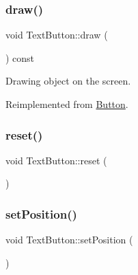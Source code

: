 \mbox{\label{class_text_button_a8af6b4a6e9084f157ffb015d29a02fcf}} 
\subsubsection{\texorpdfstring{draw()}{draw()}}
{\footnotesize\ttfamily void Text\+Button\+::draw (\begin{DoxyParamCaption}\item[{\mbox{\hyperlink{class_game_engine}{Game\+Engine}} $\ast$}]{ }\end{DoxyParamCaption}) const\hspace{0.3cm}{\ttfamily [virtual]}}



Drawing object on the screen. 



Reimplemented from \mbox{\hyperlink{class_button_a99e75218b31357786cff815f87f1a093}{Button}}.

\mbox{\label{class_text_button_aed840bcd62454c1233d4eadaa8b6e3b5}} 
\subsubsection{\texorpdfstring{reset()}{reset()}}
{\footnotesize\ttfamily void Text\+Button\+::reset (\begin{DoxyParamCaption}{ }\end{DoxyParamCaption})\hspace{0.3cm}{\ttfamily [inline]}}

\mbox{\label{class_text_button_a4550c33ce65f77b9e9e119526bfcc357}} 
\subsubsection{\texorpdfstring{setPosition()}{setPosition()}}
{\footnotesize\ttfamily void Text\+Button\+::set\+Position (\begin{DoxyParamCaption}\item[{const sf\+::\+Vector2f \&}]{ }\end{DoxyParamCaption})\hspace{0.3cm}{\ttfamily [virtual]}}



